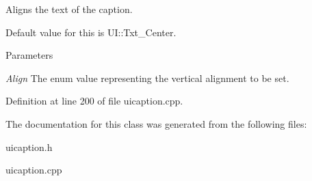 Aligns the text of the caption. 

Default value for this is UI::Txt\_\-Center. 
\begin{DoxyParams}{Parameters}
\item[{\em Align}]The enum value representing the vertical alignment to be set. \end{DoxyParams}


Definition at line 200 of file uicaption.cpp.



The documentation for this class was generated from the following files:\begin{DoxyCompactItemize}
\item 
uicaption.h\item 
uicaption.cpp\end{DoxyCompactItemize}
